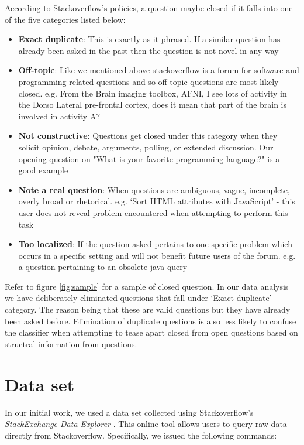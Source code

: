 \documentclass[11pt]{article}
\begin{document}
\noindent According to Stackoverflow's policies, a question maybe
closed if it falls into one of the five categories listed below:

\begin{itemize}
\item \textbf{Exact duplicate}: This is exactly as it phrased. If a similar question has already been asked in the past then the question is not novel in any way
\item \textbf{Off-topic}: Like we mentioned above stackoverflow is a forum for software and programming related questions and so off-topic questions are most likely closed. e.g. From the Brain imaging toolbox, AFNI, I see lots of activity in the Dorso Lateral pre-frontal cortex, does it mean that part of the brain is involved in activity A?
\item \textbf{Not constructive}: Questions get closed under this category when they solicit opinion, debate, arguments, polling, or extended discussion. Our opening question on "What is your favorite programming language?" is a good example
\item \textbf{Note a real question}: When questions are ambiguous, vague, incomplete, overly broad or rhetorical. e.g. `Sort HTML attributes with JavaScript' - this user does not reveal problem encountered when attempting to perform this task
\item \textbf{Too localized}: If the question asked pertains to one specific problem which occurs in a specific setting and will not benefit future users of the forum. e.g. a question pertaining to an obsolete java query
\end{itemize}

\noindent Refer to figure \ref{fig:sample} for a sample of closed question. In our data analysis we have deliberately eliminated questions that fall under `Exact duplicate' category. The reason being that these are valid questions but they have already been asked before. Elimination of duplicate questions is  also less likely to confuse the classifier when attempting to tease apart closed from open questions based on structral information from questions.

\section{Data set}
In our initial work, we used a data set collected using
Stackoverflow's \emph{StackExchange Data Explorer}
\cite{website:stackexchange}. This online tool
allows users to query raw data directly from
Stackoverflow. Specifically, we issued the following commands:
\end{document}
